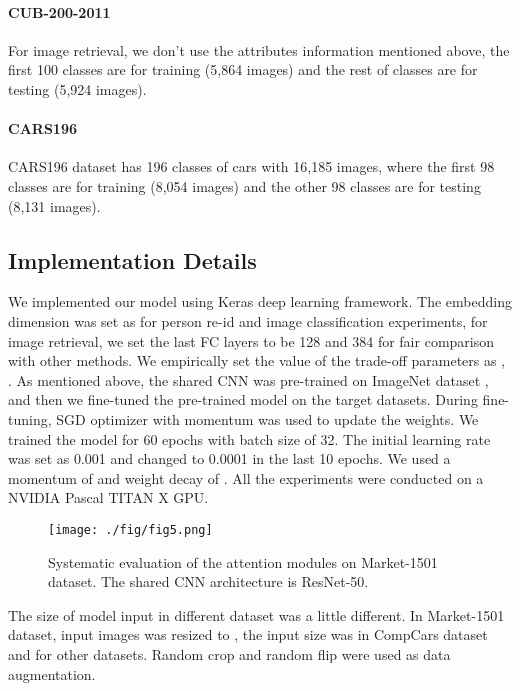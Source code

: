\documentclass[sigconf]{acmart}
\begin{document}
\paragraph{CUB-200-2011}
For image retrieval, we don't use the attributes information mentioned above, the first 100 classes are for training (5,864 images) and the rest of classes are for testing (5,924 images).

\paragraph{CARS196}
CARS196 dataset \cite{cars196} has 196 classes of cars with 16,185 images, where the first 98 classes are for training (8,054 images) and the other 98 classes are for testing (8,131 images).

\subsection{Implementation Details}
We implemented our model using Keras \cite{chollet2015keras} deep learning framework. The embedding dimension was set as  for person re-id and image classification experiments, for image retrieval, we set the last FC layers to be 128 and 384 for fair comparison with other methods. We empirically set the value of the trade-off parameters as , . As mentioned above, the shared CNN was pre-trained on ImageNet dataset \cite{russakovsky2015imagenet}, and then we fine-tuned the pre-trained model on the target datasets. During fine-tuning, SGD optimizer with momentum was used to update the weights. We trained the model for 60 epochs with batch size of 32. The initial learning rate was set as 0.001 and changed to 0.0001 in the last 10 epochs. We used a momentum of  and weight decay of . All the experiments were conducted on a NVIDIA Pascal TITAN X GPU.

\begin{figure}[!htp]
\begin{center}
   \texttt{[image: ./fig/fig5.png]}
\end{center}
   \caption{Systematic evaluation of the attention modules on Market-1501 dataset. The shared CNN architecture is ResNet-50.}
\label{fig:market-attention-compare}
\end{figure}

The size of model input in different dataset was a little different. In Market-1501 dataset, input images was resized to , the input size was  in CompCars dataset and  for other datasets. Random crop and random flip were used as data augmentation. 
\end{document}
